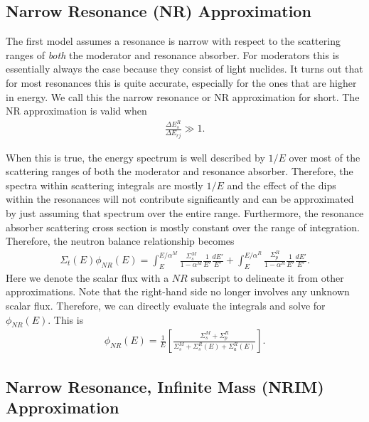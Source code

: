 \subsection{Narrow Resonance (NR) Approximation} \label{Sec:thermalization_narrowResonanceApproximation_HomogeneousMixture}

The first model assumes a resonance is narrow with respect to the scattering ranges of \emph{both} the moderator and resonance absorber. For moderators this is essentially always the case because they consist of light nuclides. It turns out that for most resonances this is quite accurate, especially for the ones that are higher in energy. We call this the narrow resonance or NR approximation for short. The NR approximation is valid when
\begin{align}
  \frac{ \Delta E_s^R }{ \Delta E_{rj} } \gg 1 .
\end{align}

When this is true, the energy spectrum is well described by $1/E$ over most of the scattering ranges of both the moderator and resonance absorber. Therefore, the spectra within scattering integrals are mostly $1/E$ and the effect of the dips within the resonances will not contribute significantly and can be approximated by just assuming that spectrum over the entire range. Furthermore, the resonance absorber scattering cross section is mostly constant over the range of integration. Therefore, the neutron balance relationship becomes
\begin{align}
  \Sigma_t(E) \phi_{NR}(E) = \int_E^{E/\alpha^M} \frac{\Sigma_s^M}{ 1 - \alpha^M } \frac{1}{E'} \frac{dE'}{E'} + \int_E^{E/\alpha^R} \frac{\Sigma_p^R}{ 1 - \alpha^R } \frac{1}{E'} \frac{dE'}{E'} .
\end{align}
Here we denote the scalar flux with a $NR$ subscript to delineate it from other approximations. Note that the right-hand side no longer involves any unknown scalar flux. Therefore, we can directly evaluate the integrals and solve for $\phi_{NR}(E)$. This is
\begin{align}
  \phi_{NR}(E) = \frac{1}{E} \left[ \frac{ \Sigma_s^M + \Sigma_p^R }{ \Sigma_s^M + \Sigma_s^R(E) + \Sigma_a^R(E) } \right] . \label{Eq:thermalization_NR_FluxSpectrum}
\end{align}

\subsection{Narrow Resonance, Infinite Mass (NRIM) Approximation}

